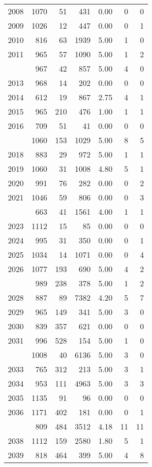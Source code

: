 \documentclass[
]{article}
\begin{document}
\begin{table}
\begin{tabular}[t]{lrrrrrr}
2008 & 1070 & 51 & 431 & 0.00 & 0 & 0\\
2009 & 1026 & 12 & 447 & 0.00 & 0 & 1\\
2010 & 816 & 63 & 1939 & 5.00 & 1 & 0\\
2011 & 965 & 57 & 1090 & 5.00 & 1 & 2\\
\addlinespace
2012 & 967 & 42 & 857 & 5.00 & 4 & 0\\
2013 & 968 & 14 & 202 & 0.00 & 0 & 0\\
2014 & 612 & 19 & 867 & 2.75 & 4 & 1\\
2015 & 965 & 210 & 476 & 1.00 & 1 & 1\\
2016 & 709 & 51 & 41 & 0.00 & 0 & 0\\
\addlinespace
2017 & 1060 & 153 & 1029 & 5.00 & 8 & 5\\
2018 & 883 & 29 & 972 & 5.00 & 1 & 1\\
2019 & 1060 & 31 & 1008 & 4.80 & 5 & 1\\
2020 & 991 & 76 & 282 & 0.00 & 0 & 2\\
2021 & 1046 & 59 & 806 & 0.00 & 0 & 3\\
\addlinespace
2022 & 663 & 41 & 1561 & 4.00 & 1 & 1\\
2023 & 1112 & 15 & 85 & 0.00 & 0 & 0\\
2024 & 995 & 31 & 350 & 0.00 & 0 & 1\\
2025 & 1034 & 14 & 1071 & 0.00 & 0 & 4\\
2026 & 1077 & 193 & 690 & 5.00 & 4 & 2\\
\addlinespace
2027 & 989 & 238 & 378 & 5.00 & 1 & 2\\
2028 & 887 & 89 & 7382 & 4.20 & 5 & 7\\
2029 & 965 & 149 & 341 & 5.00 & 3 & 0\\
2030 & 839 & 357 & 621 & 0.00 & 0 & 0\\
2031 & 996 & 528 & 154 & 5.00 & 1 & 0\\
\addlinespace
2032 & 1008 & 40 & 6136 & 5.00 & 3 & 0\\
2033 & 765 & 312 & 213 & 5.00 & 3 & 1\\
2034 & 953 & 111 & 4963 & 5.00 & 3 & 3\\
2035 & 1135 & 91 & 96 & 0.00 & 0 & 0\\
2036 & 1171 & 402 & 181 & 0.00 & 0 & 1\\
\addlinespace
2037 & 809 & 484 & 3512 & 4.18 & 11 & 11\\
2038 & 1112 & 159 & 2580 & 1.80 & 5 & 1\\
2039 & 818 & 464 & 399 & 5.00 & 4 & 8\\

\end{tabular}
\end{table}
\end{document}
